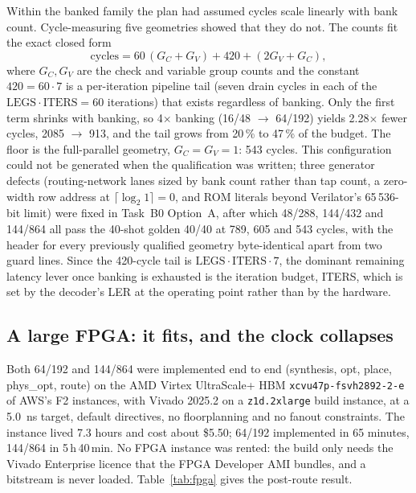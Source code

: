Within the banked family the plan had assumed cycles scale linearly with bank
count. Cycle-measuring five geometries showed that they do not. The counts fit
the exact closed form
\begin{equation}
  \mathrm{cycles} = 60\,(G_C+G_V) + 420 + (2G_V + G_C),
  \label{eq:cycles}
\end{equation}
where $G_C,G_V$ are the check and variable group counts and the constant
$420 = 60\cdot 7$ is a per-iteration pipeline tail (seven drain cycles in each
of the $\mathrm{LEGS}\cdot\mathrm{ITERS}=60$ iterations) that exists regardless
of banking. Only the first term shrinks with banking, so 4$\times$ banking
(16/48 $\to$ 64/192) yields 2.28$\times$ fewer cycles, 2085 $\to$ 913, and the
tail grows from 20\,\% to 47\,\% of the budget.
The floor is the full-parallel geometry, $G_C=G_V=1$: 543 cycles. This
configuration could not be generated when the qualification was written; three
generator defects (routing-network lanes sized by bank count rather than tap
count, a zero-width row address at $\lceil\log_2 1\rceil=0$, and ROM literals
beyond Verilator's 65\,536-bit limit) were fixed in Task~B0 Option~A, after
which 48/288, 144/432 and 144/864 all pass the 40-shot golden 40/40 at 789, 605
and 543 cycles, with the header for every previously qualified geometry
byte-identical apart from two guard lines.
Since the 420-cycle tail is $\mathrm{LEGS}\cdot\mathrm{ITERS}\cdot 7$, the
dominant remaining latency lever once banking is exhausted is the iteration
budget, ITERS, which is set by the decoder's LER at the operating point rather
than by the hardware.

\subsection*{A large FPGA: it fits, and the clock collapses}

Both 64/192 and 144/864 were implemented end to end (synthesis, opt, place,
phys\_opt, route) on the AMD Virtex UltraScale+ HBM \texttt{xcvu47p-fsvh2892-2-e}
of AWS's F2 instances, with Vivado 2025.2 on a \texttt{z1d.2xlarge} build
instance, at a \SI{5.0}{\nano\second} target, default directives, no
floorplanning and no fanout constraints. The instance lived 7.3 hours and cost
about \$5.50; 64/192 implemented in 65 minutes, 144/864 in 5\,h\,40\,min.
No FPGA instance was rented: the build only needs the Vivado Enterprise licence
that the FPGA Developer AMI bundles, and a bitstream is never loaded.
Table~\ref{tab:fpga} gives the post-route result.

